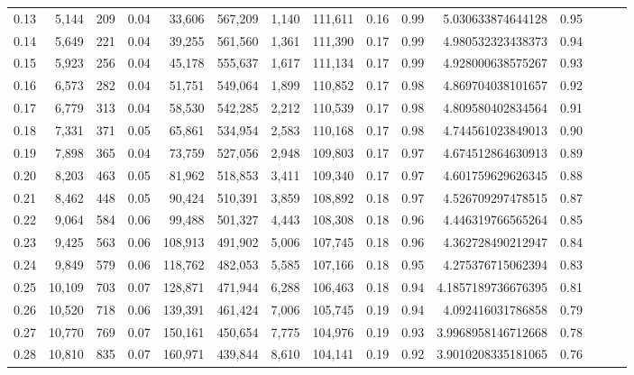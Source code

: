 \begin{tabular}{rrrrrrrrrrrrrrr}
0.13 &   5,144 &    209 &  0.04 &   33,606 &  567,209 &    1,140 &  111,611 &  0.16 &  0.99 &      5.030633874644128 &      0.95 \\
0.14 &   5,649 &    221 &  0.04 &   39,255 &  561,560 &    1,361 &  111,390 &  0.17 &  0.99 &      4.980532323438373 &      0.94 \\
0.15 &   5,923 &    256 &  0.04 &   45,178 &  555,637 &    1,617 &  111,134 &  0.17 &  0.99 &      4.928000638575267 &      0.93 \\
0.16 &   6,573 &    282 &  0.04 &   51,751 &  549,064 &    1,899 &  110,852 &  0.17 &  0.98 &      4.869704038101657 &      0.92 \\
0.17 &   6,779 &    313 &  0.04 &   58,530 &  542,285 &    2,212 &  110,539 &  0.17 &  0.98 &      4.809580402834564 &      0.91 \\
0.18 &   7,331 &    371 &  0.05 &   65,861 &  534,954 &    2,583 &  110,168 &  0.17 &  0.98 &      4.744561023849013 &      0.90 \\
0.19 &   7,898 &    365 &  0.04 &   73,759 &  527,056 &    2,948 &  109,803 &  0.17 &  0.97 &      4.674512864630913 &      0.89 \\
0.20 &   8,203 &    463 &  0.05 &   81,962 &  518,853 &    3,411 &  109,340 &  0.17 &  0.97 &      4.601759629626345 &      0.88 \\
0.21 &   8,462 &    448 &  0.05 &   90,424 &  510,391 &    3,859 &  108,892 &  0.18 &  0.97 &      4.526709297478515 &      0.87 \\
0.22 &   9,064 &    584 &  0.06 &   99,488 &  501,327 &    4,443 &  108,308 &  0.18 &  0.96 &      4.446319766565264 &      0.85 \\
0.23 &   9,425 &    563 &  0.06 &  108,913 &  491,902 &    5,006 &  107,745 &  0.18 &  0.96 &      4.362728490212947 &      0.84 \\
0.24 &   9,849 &    579 &  0.06 &  118,762 &  482,053 &    5,585 &  107,166 &  0.18 &  0.95 &      4.275376715062394 &      0.83 \\
0.25 &  10,109 &    703 &  0.07 &  128,871 &  471,944 &    6,288 &  106,463 &  0.18 &  0.94 &     4.1857189736676395 &      0.81 \\
0.26 &  10,520 &    718 &  0.06 &  139,391 &  461,424 &    7,006 &  105,745 &  0.19 &  0.94 &      4.092416031786858 &      0.79 \\
0.27 &  10,770 &    769 &  0.07 &  150,161 &  450,654 &    7,775 &  104,976 &  0.19 &  0.93 &     3.9968958146712668 &      0.78 \\
0.28 &  10,810 &    835 &  0.07 &  160,971 &  439,844 &    8,610 &  104,141 &  0.19 &  0.92 &     3.9010208335181065 &      0.76 \\

\end{tabular}
